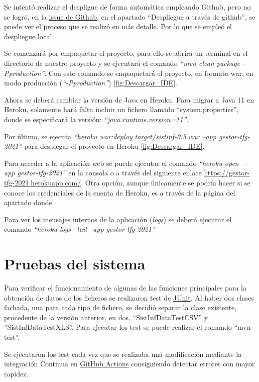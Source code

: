 
Se intentó realizar el despligue de forma automática empleando Github, pero no se logró, en la \href{https://github.com/dbo1001/Gestor-TFG-2021/issues/112}{issue de Github}, en el apartado ``Despliegue a través de github'', se puede ver el proceso que se realizó en más detalle. Por lo que se empleó el despliegue local. 

Se comenzará por empaquetar el proyecto, para ello se abrirá un terminal en el directorio de nuestro proyecto y se ejecutará el comando \emph{``mvn clean package -Pproduction''}. Con este comando se empaquetará el proyecto, en formato war, en modo producción (\emph{``-Pproduction''}) \ref{fig:Descargar_IDE}.


Ahora se deberá cambiar la versión de Java en Heroku. Para migrar a Java 11 en Heroku, solamente hará falta incluir un fichero llamado ``system.properties'', donde se especificará la versión: \emph{``java.runtime.version=11''}.

Por último, se ejecuta \emph{``heroku war:deploy target/sistinf-0.5.war --app gestor-tfg-2021''} para desplegar el proyecto en Heroku \ref{fig:Descargar_IDE}. 


Para acceder a la aplicación web se puede ejecutar el comando \emph{“heroku open –-app gestor-tfg-2021”} en la consola o a través del siguiente enlace \href{https://gestor-tfg-2021.herokuapp.com/}{https://gestor-tfg-2021.herokuapp.com/}. Otra opción, aunque únicamente se podría hacer si se conoce los credenciales de la cuenta de Heroku, es a través de la página del apartado donde 

Para ver los mensajes internos de la aplicación (\emph{logs}) se deberá ejecutar el comando \emph{``heroku logs --tail --app gestor-tfg-2021''}

\section{Pruebas del sistema}

Para verificar el funcionamiento de algunas de las funciones principales para la obtención de datos de los ficheros se realizaron test de \href{https://junit.org/junit5/}{JUnit}. Al haber dos clases fachada, una para cada tipo de fichero, se decidió separar la clase existente, procedente de la versión anterior, en dos, ``SistInfDataTestCSV'' y ''SistInfDataTestXLS''. Para ejecutar los test se puede realizar el comando ``mvn test''.

Se ejecutaron los test cada vez que se realizaba una modificación mediante la integración Continua en \href{https://github.com/dbo1001/Gestor-TFG-2021/actions}{GitHub Actions} consiguiendo detectar errores con mayor rapidez.